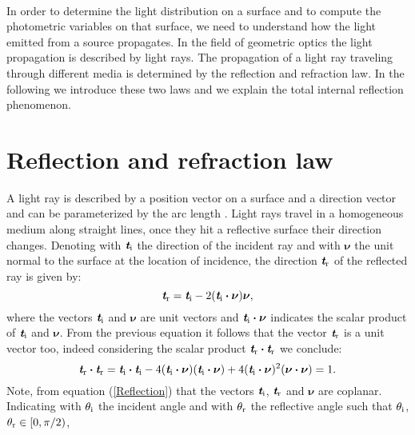 \\ \indent In order to determine the light distribution on a surface and to compute the photometric variables on that surface, we need to understand how the light emitted from a source propagates. In the field of geometric optics the light propagation is described by light rays.
The propagation of a light ray traveling through different media is determined by the reflection and refraction law.
In the following we introduce these two laws and we explain the total internal reflection phenomenon.
\section{Reflection and refraction law}\label{sec:reflection}
A light ray is described by a position vector  on a surface and a direction vector  and can be parameterized by the arc length .
Light rays travel in a homogeneous medium along straight lines, once they hit a reflective surface their direction changes.
 Denoting with $\textit{\textbf{t}}_\textrm{i}$ the direction of the incident ray and with $\boldsymbol{\nu}$ the unit normal to the surface at the location of incidence, the direction $\textit{\textbf{t}}_\textrm{r}$ of the reflected ray is given by:
 \begin{equation}\label{Reflection}
  \textit{\textbf{t}}_\textrm{r} = \textit{\textbf{t}}_\textrm{i}-2 (\textit{\textbf{t}}_\textrm{i}\boldsymbol{\cdot}\boldsymbol{\nu})\boldsymbol{\nu},
\end{equation}
where the vectors $\textit{\textbf{t}}_\textrm{i}$ and $\boldsymbol{\nu}$ are unit vectors and $\textit{\textbf{t}}_\textrm{i}\boldsymbol{\cdot}\boldsymbol{\nu}$ indicates the scalar product of
$\textit{\textbf{t}}_\textrm{i}$ and $\boldsymbol{\nu}$. 
From the previous equation it follows that the vector  $\textit{\textbf{t}}_\textrm{r}$ is a unit vector too, indeed considering the scalar product $\textit{\textbf{t}}_\textrm{r}\boldsymbol{\cdot}\textit{\textbf{t}}_\textrm{r}$ we conclude:
\begin{equation}\label{unit_vector}
\textit{\textbf{t}}_\textrm{r}\boldsymbol{\cdot}\textit{\textbf{t}}_\textrm{r} = \textit{\textbf{t}}_\textrm{i}\boldsymbol{\cdot}\textit{\textbf{t}}_\textrm{i} 
- 4(\textit{\textbf{t}}_\textrm{i}\boldsymbol{\cdot}\boldsymbol{\nu})(\textit{\textbf{t}}_\textrm{i}\boldsymbol{\cdot}\boldsymbol{\nu})+
4(\textit{\textbf{t}}_\textrm{i}\boldsymbol{\cdot}\boldsymbol{\nu})^2(\boldsymbol{\nu}\boldsymbol{\cdot}\boldsymbol{\nu})=1 .
\end{equation} 
Note, from equation (\ref{Reflection}) that the vectors $\textit{\textbf{t}}_\textrm{i}$, $\textit{\textbf{t}}_\textrm{r}$ and $\boldsymbol{\nu}$ are coplanar.
Indicating with $\theta_\textrm{i}$ the incident angle and with $\theta_\textrm{r}$ the reflective angle such that $\theta_\textrm{i}$, $\theta_\textrm{r} \in[0, \pi/2)$,
